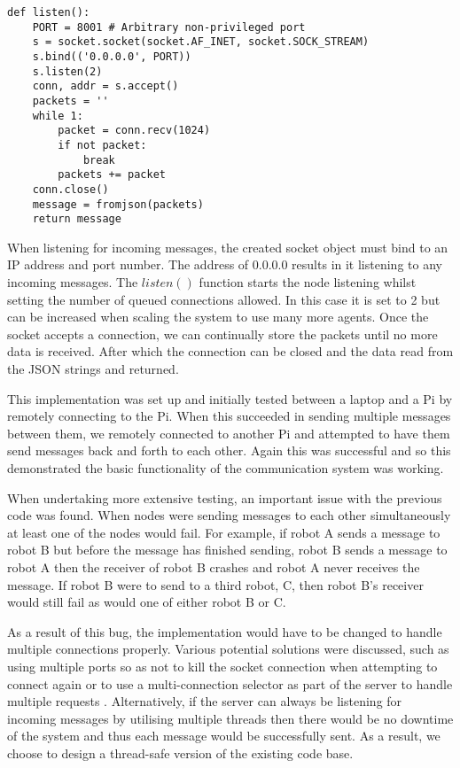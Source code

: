 \begin{lstlisting}
def listen():
    PORT = 8001 # Arbitrary non-privileged port
    s = socket.socket(socket.AF_INET, socket.SOCK_STREAM)
    s.bind(('0.0.0.0', PORT))
    s.listen(2)
    conn, addr = s.accept()
    packets = ''
    while 1:
        packet = conn.recv(1024)
        if not packet:
            break
        packets += packet
    conn.close()
    message = fromjson(packets)
    return message
\end{lstlisting}
When listening for incoming messages, the created socket object must bind to
an IP address and port number. The address of 0.0.0.0 results in it listening
to any incoming messages. The $listen()$ function starts the node listening
whilst setting the number of queued connections allowed. In this case it is
set to 2 but can be increased when scaling the system to use many more agents.
Once the socket  accepts a connection, we can continually store the packets
until no more data is received. After which the connection can be closed and
the data read from the JSON strings and returned.

This implementation was set up and initially tested between a laptop and a Pi
by remotely connecting to the Pi. When this succeeded in sending multiple
messages between them, we remotely connected to another Pi and attempted to
have them send messages back and forth to each other. Again this was successful
and so this demonstrated the basic functionality of the communication system was
working.

When undertaking more extensive testing, an important issue with the previous
code was found. When nodes were sending messages to each other simultaneously
at least one of the nodes would fail. For example, if robot A sends a message to
robot B but before the message has finished sending, robot B sends a message to
robot A then the receiver of robot B crashes and robot A never receives the message.
If robot B were to send to a third robot, C, then robot B's receiver would still
fail as would one of either robot B or C.

As a result of this bug, the implementation would have to be changed to handle
multiple connections properly. Various potential solutions were discussed,
such as using multiple ports so as not to kill the socket connection when
attempting to connect again or to use a multi-connection selector as part of
the server to handle multiple requests \cite{multiconnectionServer}.
Alternatively, if the server can always be listening for incoming messages by
utilising multiple threads then there would be no downtime of the system and
thus each message would be successfully sent. As a result, we choose to
design a thread-safe version of the existing code base.

